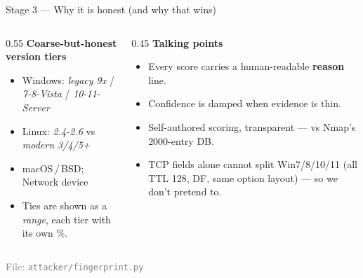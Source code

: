 \documentclass[10pt,aspectratio=169]{beamer}
\begin{document}
\begin{frame}{Stage 3 --- Why it is honest (and why that wins)}
  \begin{columns}[T]
    \begin{column}{0.55\textwidth}
      \textbf{Coarse-but-honest version tiers}
      \begin{itemize}
        \item Windows: \emph{legacy 9x} / \emph{7-8-Vista} / \emph{10-11-Server}
        \item Linux: \emph{2.4-2.6} vs \emph{modern 3/4/5+}
        \item macOS\,/\,BSD; Network device
        \item Ties are shown as a \emph{range}, each tier with its own \%.
      \end{itemize}
    \end{column}
    \begin{column}{0.45\textwidth}
      \textbf{Talking points}
      \begin{itemize}
        \item Every score carries a human-readable \textbf{reason} line.
        \item Confidence is \alert{damped} when evidence is thin.
        \item Self-authored scoring, transparent --- vs Nmap's 2000-entry DB.
        \item TCP fields alone cannot split Win7/8/10/11 (all TTL 128, DF, same
              option layout) --- so we don't pretend to.
      \end{itemize}
    \end{column}
  \end{columns}
  \vspace{0.3em}
  \footnotesize\textcolor{gray}{File: \texttt{attacker/fingerprint.py}}
\end{frame}

\end{document}
